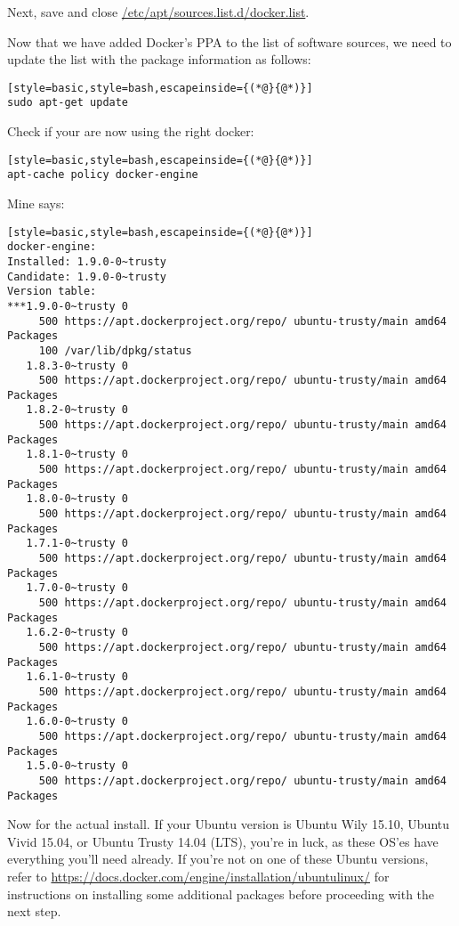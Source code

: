 Next, save and close \url{/etc/apt/sources.list.d/docker.list}.

Now that we have added Docker's PPA to the list of software sources, we need to update the list with the package information as follows:
\begin{lstlisting}[style=basic,style=bash,escapeinside={(*@}{@*)}]
sudo apt-get update
\end{lstlisting}

Check if your are now using the right docker:
\begin{lstlisting}[style=basic,style=bash,escapeinside={(*@}{@*)}]
apt-cache policy docker-engine
\end{lstlisting}
Mine says:
\begin{lstlisting}[style=basic,style=bash,escapeinside={(*@}{@*)}]
docker-engine:
Installed: 1.9.0-0~trusty
Candidate: 1.9.0-0~trusty
Version table:
***1.9.0-0~trusty 0
     500 https://apt.dockerproject.org/repo/ ubuntu-trusty/main amd64 Packages
     100 /var/lib/dpkg/status
   1.8.3-0~trusty 0
     500 https://apt.dockerproject.org/repo/ ubuntu-trusty/main amd64 Packages
   1.8.2-0~trusty 0
     500 https://apt.dockerproject.org/repo/ ubuntu-trusty/main amd64 Packages
   1.8.1-0~trusty 0
     500 https://apt.dockerproject.org/repo/ ubuntu-trusty/main amd64 Packages
   1.8.0-0~trusty 0
     500 https://apt.dockerproject.org/repo/ ubuntu-trusty/main amd64 Packages
   1.7.1-0~trusty 0
     500 https://apt.dockerproject.org/repo/ ubuntu-trusty/main amd64 Packages
   1.7.0-0~trusty 0
     500 https://apt.dockerproject.org/repo/ ubuntu-trusty/main amd64 Packages
   1.6.2-0~trusty 0
     500 https://apt.dockerproject.org/repo/ ubuntu-trusty/main amd64 Packages
   1.6.1-0~trusty 0
     500 https://apt.dockerproject.org/repo/ ubuntu-trusty/main amd64 Packages
   1.6.0-0~trusty 0
     500 https://apt.dockerproject.org/repo/ ubuntu-trusty/main amd64 Packages
   1.5.0-0~trusty 0
     500 https://apt.dockerproject.org/repo/ ubuntu-trusty/main amd64 Packages
\end{lstlisting}

Now for the actual install. If your Ubuntu version is Ubuntu Wily 15.10, Ubuntu Vivid 15.04, or Ubuntu Trusty 14.04 (LTS), you're in luck, as these OS'es have everything you'll need already. If you're not on one of these Ubuntu versions, refer to \url{https://docs.docker.com/engine/installation/ubuntulinux/} for instructions on installing some additional packages before proceeding with the next step.

